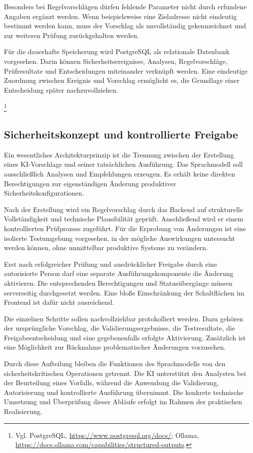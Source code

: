 Besonders bei Regelvorschlägen dürfen fehlende Parameter nicht
durch erfundene Angaben ergänzt werden. Wenn beispielsweise eine
Zieladresse nicht eindeutig bestimmt werden kann, muss der
Vorschlag als unvollständig gekennzeichnet und zur weiteren
Prüfung zurückgehalten werden.

Für die dauerhafte Speicherung wird PostgreSQL als relationale
Datenbank vorgesehen. Darin können Sicherheitsereignisse,
Analysen, Regelvorschläge, Prüfresultate und Entscheidungen
miteinander verknüpft werden. Eine eindeutige Zuordnung zwischen
Ereignis und Vorschlag ermöglicht es, die Grundlage einer
Entscheidung später nachzuvollziehen.

\footnote{Vgl. PostgreSQL, \url{https://www.postgresql.org/docs/};
Ollama, \url{https://docs.ollama.com/capabilities/structured-outputs}.}

\subsection{Sicherheitskonzept und kontrollierte Freigabe}

Ein wesentliches Architekturprinzip ist die Trennung zwischen
der Erstellung eines KI-Vorschlags und seiner tatsächlichen
Ausführung. Das Sprachmodell soll ausschließlich Analysen und
Empfehlungen erzeugen. Es erhält keine direkten Berechtigungen
zur eigenständigen Änderung produktiver Sicherheitskonfigurationen.

Nach der Erstellung wird ein Regelvorschlag durch das Backend
auf strukturelle Vollständigkeit und technische Plausibilität
geprüft. Anschließend wird er einem kontrollierten Prüfprozess
zugeführt. Für die Erprobung von Änderungen ist eine isolierte
Testumgebung vorgesehen, in der mögliche Auswirkungen untersucht
werden können, ohne unmittelbar produktive Systeme zu verändern.

Erst nach erfolgreicher Prüfung und ausdrücklicher Freigabe durch
eine autorisierte Person darf eine separate Ausführungskomponente
die Änderung aktivieren. Die entsprechenden Berechtigungen und
Statusübergänge müssen serverseitig durchgesetzt werden. Eine
bloße Einschränkung der Schaltflächen im Frontend ist dafür
nicht ausreichend.

Die einzelnen Schritte sollen nachvollziehbar protokolliert
werden. Dazu gehören der ursprüngliche Vorschlag, die
Validierungsergebnisse, die Testresultate, die Freigabeentscheidung
und eine gegebenenfalls erfolgte Aktivierung. Zusätzlich ist
eine Möglichkeit zur Rücknahme problematischer Änderungen
vorzusehen.

Durch diese Aufteilung bleiben die Funktionen des Sprachmodells
von den sicherheitskritischen Operationen getrennt. Die KI
unterstützt den Analysten bei der Beurteilung eines Vorfalls,
während die Anwendung die Validierung, Autorisierung und
kontrollierte Ausführung übernimmt. Die konkrete technische
Umsetzung und Überprüfung dieser Abläufe erfolgt im Rahmen
der praktischen Realisierung.
